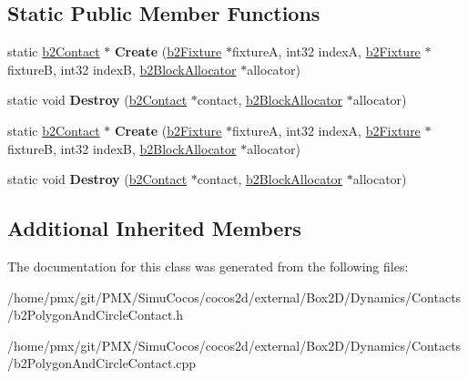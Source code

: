 \subsection*{Static Public Member Functions}
\begin{DoxyCompactItemize}
\item 
\mbox{\label{classb2PolygonAndCircleContact_a0b83e092a7d14f9cdd919fa15ef6058f}} 
static \hyperlink{classb2Contact}{b2\+Contact} $\ast$ {\bfseries Create} (\hyperlink{classb2Fixture}{b2\+Fixture} $\ast$fixtureA, int32 indexA, \hyperlink{classb2Fixture}{b2\+Fixture} $\ast$fixtureB, int32 indexB, \hyperlink{classb2BlockAllocator}{b2\+Block\+Allocator} $\ast$allocator)
\item 
\mbox{\label{classb2PolygonAndCircleContact_a04e9a3fcdcf52821fb90b8206b8bb2f0}} 
static void {\bfseries Destroy} (\hyperlink{classb2Contact}{b2\+Contact} $\ast$contact, \hyperlink{classb2BlockAllocator}{b2\+Block\+Allocator} $\ast$allocator)
\item 
\mbox{\label{classb2PolygonAndCircleContact_a0ff5b8e7167146b5716bce55365b7fc3}} 
static \hyperlink{classb2Contact}{b2\+Contact} $\ast$ {\bfseries Create} (\hyperlink{classb2Fixture}{b2\+Fixture} $\ast$fixtureA, int32 indexA, \hyperlink{classb2Fixture}{b2\+Fixture} $\ast$fixtureB, int32 indexB, \hyperlink{classb2BlockAllocator}{b2\+Block\+Allocator} $\ast$allocator)
\item 
\mbox{\label{classb2PolygonAndCircleContact_a666779f20aa3b57cfc0c60e3ac235f6b}} 
static void {\bfseries Destroy} (\hyperlink{classb2Contact}{b2\+Contact} $\ast$contact, \hyperlink{classb2BlockAllocator}{b2\+Block\+Allocator} $\ast$allocator)
\end{DoxyCompactItemize}
\subsection*{Additional Inherited Members}


The documentation for this class was generated from the following files\+:\begin{DoxyCompactItemize}
\item 
/home/pmx/git/\+P\+M\+X/\+Simu\+Cocos/cocos2d/external/\+Box2\+D/\+Dynamics/\+Contacts/b2\+Polygon\+And\+Circle\+Contact.\+h\item 
/home/pmx/git/\+P\+M\+X/\+Simu\+Cocos/cocos2d/external/\+Box2\+D/\+Dynamics/\+Contacts/b2\+Polygon\+And\+Circle\+Contact.\+cpp\end{DoxyCompactItemize}
